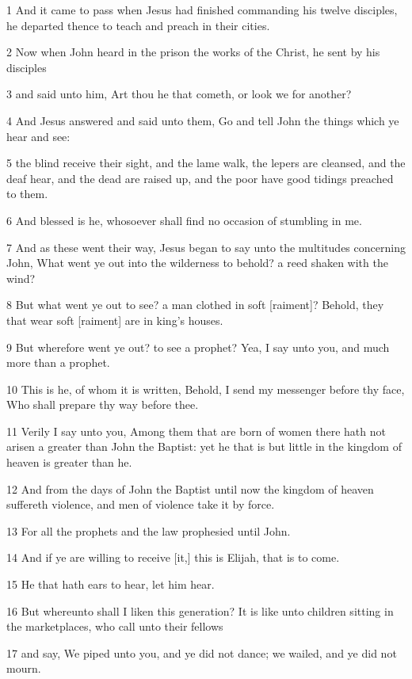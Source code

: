 \par 1 And it came to pass when Jesus had finished commanding his twelve disciples, he departed thence to teach and preach in their cities.
\par 2 Now when John heard in the prison the works of the Christ, he sent by his disciples
\par 3 and said unto him, Art thou he that cometh, or look we for another?
\par 4 And Jesus answered and said unto them, Go and tell John the things which ye hear and see:
\par 5 the blind receive their sight, and the lame walk, the lepers are cleansed, and the deaf hear, and the dead are raised up, and the poor have good tidings preached to them.
\par 6 And blessed is he, whosoever shall find no occasion of stumbling in me.
\par 7 And as these went their way, Jesus began to say unto the multitudes concerning John, What went ye out into the wilderness to behold? a reed shaken with the wind?
\par 8 But what went ye out to see? a man clothed in soft [raiment]? Behold, they that wear soft [raiment] are in king's houses.
\par 9 But wherefore went ye out? to see a prophet? Yea, I say unto you, and much more than a prophet.
\par 10 This is he, of whom it is written, Behold, I send my messenger before thy face, Who shall prepare thy way before thee.
\par 11 Verily I say unto you, Among them that are born of women there hath not arisen a greater than John the Baptist: yet he that is but little in the kingdom of heaven is greater than he.
\par 12 And from the days of John the Baptist until now the kingdom of heaven suffereth violence, and men of violence take it by force.
\par 13 For all the prophets and the law prophesied until John.
\par 14 And if ye are willing to receive [it,] this is Elijah, that is to come.
\par 15 He that hath ears to hear, let him hear.
\par 16 But whereunto shall I liken this generation? It is like unto children sitting in the marketplaces, who call unto their fellows
\par 17 and say, We piped unto you, and ye did not dance; we wailed, and ye did not mourn.

